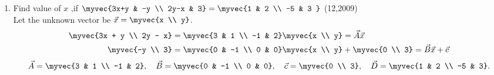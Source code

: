\begin{enumerate}[label=\thesubsection.\arabic*, ref=\thesubsection.\theenumi]
	\item Find value of $x$ ,if $\myvec{3x+y & -y \\
										2y-x  & 3}    = \myvec{1 & 2 \\
										                       -5 & 3  }$ \hfill{(12,2009)} \\

	\solution
	Let the unknown vector be $\vec{x} = \myvec{x \\ y}$.
	\begin{align}
		\myvec{3x + y \\ 2y - x} &= \myvec{3 & 1 \\ -1 & 2}\myvec{x \\ y} = \vec{A}\vec{x}
		\label{eq:col1-form}
		\\
		\myvec{-y \\ 3} &= \myvec{0 & -1 \\ 0 & 0}\myvec{x \\ y} + \myvec{0 \\ 3} = \vec{B}\vec{x} + \vec{c}
		\label{eq:col2-form}
	\end{align}
	\begin{align}
		\vec{A} = \myvec{3 & 1 \\ -1 & 2}, \quad
		\vec{B} = \myvec{0 & -1 \\ 0 & 0}, \quad
		\vec{c} = \myvec{0 \\ 3}, \quad
		\vec{D} = \myvec{1 & 2 \\ -5 & 3}.
		\label{eq:matrix-defs}
	\end{align}
	

\end{enumerate}
